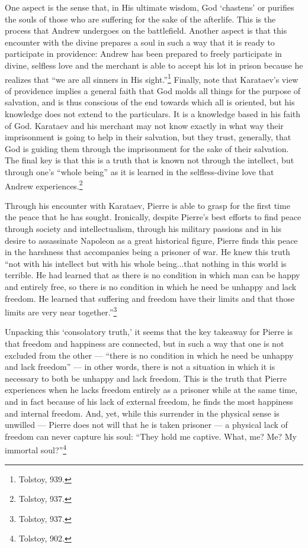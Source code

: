 \documentclass[12pt]{article}
\begin{document}
One aspect is the sense that, in His ultimate wisdom, God `chastens' or purifies the souls of those who are suffering for the sake of the afterlife. This is the process that Andrew undergoes on the battlefield. Another aspect is that this encounter with the divine prepares a soul in such a way that it is ready to participate in providence: Andrew has been prepared to freely participate in divine, selfless love and the merchant is able to accept his lot in prison because he realizes that ``we are all sinners in His sight.''\footnote{Tolstoy, 939.} Finally, note that Karataev's view of providence implies a general faith that God molds all things for the purpose of salvation, and is thus conscious of the end towards which all is oriented, but his knowledge does not extend to the particulars. It is a knowledge based in his faith of God. Karataev and his merchant may not know exactly in what way their imprisonment is going to help in their salvation, but they trust, generally, that God is guiding them through the imprisonment for the sake of their salvation. The final key is that this is a truth that is known not through the intellect, but through one's ``whole being'' as it is learned in the selfless-divine love that Andrew experiences.\footnote{Tolstoy, 937.}

Through his encounter with Karataev, Pierre is able to grasp for the first time the peace that he has sought. Ironically, despite Pierre's best efforts to find peace through society and intellectualism, through his military passions and in his desire to assassinate Napoleon as a great historical figure, Pierre finds this peace in the harshness that accompanies being a prisoner of war. He knew this truth ``not with his intellect but with his whole being...that nothing in this world is terrible. He had learned that as there is no condition in which man can be happy and entirely free, so there is no condition in which he need be unhappy and lack freedom. He learned that suffering and freedom have their limits and that those limits are very near together.''\footnote{Tolstoy, 937.}

Unpacking this `consolatory truth,' it seems that the key takeaway for Pierre is that freedom and happiness are connected, but in such a way that one is not excluded from the other --- ``there is no condition in which he need be unhappy and lack freedom'' --- in other words, there is not a situation in which it is necessary to both be unhappy and lack freedom. This is the truth that Pierre experiences when he lacks freedom entirely as a prisoner while at the same time, and in fact because of his lack of external freedom, he finds the most happiness and internal freedom. And, yet, while this surrender in the physical sense is unwilled --- Pierre does not will that he is taken prisoner --- a physical lack of freedom can never capture his soul: ``They hold me captive. What, me? Me? My immortal soul?''\footnote{Tolstoy, 902.}
 
\end{document}
